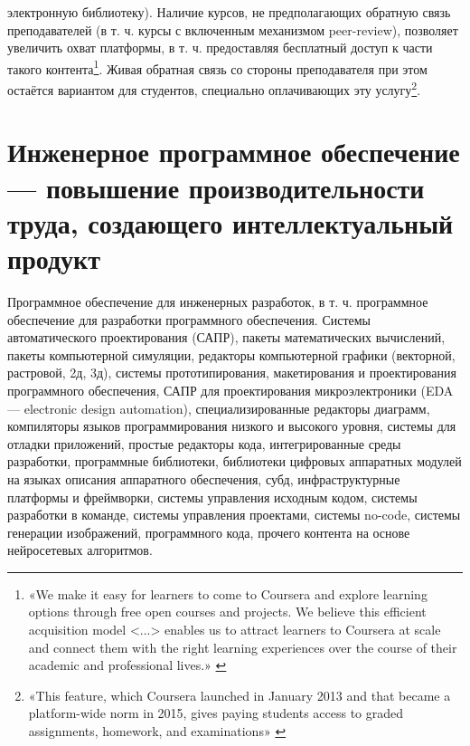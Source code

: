 \documentclass{article}
\begin{document}
электронную библиотеку). Наличие курсов, не предполагающих обратную связь преподавателей (в т. ч. курсы с включенным механизмом peer-review), позволяет увеличить охват платформы, в т. ч. предоставляя бесплатный доступ к части такого контента\footnote{«We make it easy for learners to come to Coursera and explore learning options through free open courses and projects. We believe this efficient acquisition model <...> enables us to attract learners to Coursera at scale and connect them with the right learning experiences over the course of their academic and professional lives.» \cite{courseraS1}}. Живая обратная связь со стороны преподавателя при этом остаётся вариантом для студентов, специально оплачивающих эту услугу\footnote{«This feature, which Coursera launched in January 2013 and that became a platform-wide norm in 2015, gives paying students access to graded assignments, homework, and examinations» \cite{howCourseraMakesMoney2022}}.

\section*{Инженерное программное обеспечение — повышение производительности труда, создающего интеллектуальный продукт}

Программное обеспечение для инженерных разработок, в т. ч. программное обеспечение для разработки программного обеспечения. Системы автоматического проектирования (САПР), пакеты математических вычислений, пакеты компьютерной симуляции, редакторы компьютерной графики (векторной, растровой, 2д, 3д), системы прототипирования, макетирования и проектирования программного обеспечения, САПР для проектирования микроэлектроники (EDA — electronic design automation), специализированные редакторы диаграмм, компиляторы языков программирования низкого и высокого уровня, системы для отладки приложений, простые редакторы кода, интегрированные среды разработки, программные библиотеки, библиотеки цифровых аппаратных модулей на языках описания аппаратного обеспечения, субд, инфраструктурные платформы и фреймворки, системы управления исходным кодом, системы разработки в команде, системы управления проектами, системы no-code, системы генерации изображений, программного кода, прочего контента на основе нейросетевых алгоритмов.
\end{document}
